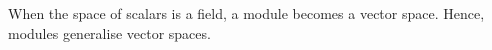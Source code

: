 \begin{remark}
  When the space of scalars is a field, a module becomes a vector space.
  Hence, modules generalise vector spaces.
\end{remark}
